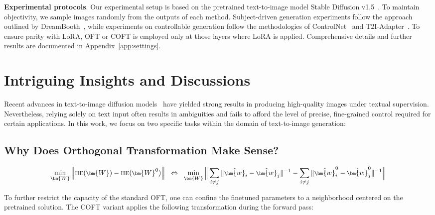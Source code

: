 \begin{itemize}[leftmargin=*,nosep]
\textbf{Experimental protocols}. Our experimental setup is based on the pretrained text-to-image model Stable Diffusion v1.5~\cite{rombach2022high}. To maintain objectivity, we sample images randomly from the outputs of each method. Subject-driven generation experiments follow the approach outlined by DreamBooth~\cite{ruiz2023dreambooth}, while experiments on controllable generation follow the methodologies of ControlNet~\cite{zhang2023adding} and T2I-Adapter~\cite{mou2023t2i}. To ensure parity with LoRA, OFT or COFT is employed only at those layers where LoRA is applied. Comprehensive details and further results are documented in Appendix~\ref{app:settings}.

\section{Intriguing Insights and Discussions}

Recent advances in text-to-image diffusion models~\cite{saharia2022photorealistic,ramesh2022hierarchical,rombach2022high} have yielded strong results in producing high-quality images under textual supervision. Nevertheless, relying solely on text input often results in ambiguities and fails to afford the level of precise, fine-grained control required for certain applications. In this work, we focus on two specific tasks within the domain of text-to-image generation:

\subsection{Why Does Orthogonal Transformation Make Sense?}

\begin{equation}\label{eq:oft_principle}
\footnotesize
\min_{\bm{W}} \left\| \text{HE}(\bm{W})-\text{HE}(\bm{W}^0)\right\|~~\Leftrightarrow~~\min_{\bm{W}} \bigg{\|} \sum_{i\neq j} \|\hat{\bm{w}}_i-\hat{\bm{w}}_j\|^{-1}-\sum_{i\neq j} \|\hat{\bm{w}}^0_i-\hat{\bm{w}}^0_j\|^{-1}\bigg{\|}
\end{equation}

To further restrict the capacity of the standard OFT, one can confine the finetuned parameters to a neighborhood centered on the pretrained solution. The COFT variant applies the following transformation during the forward pass:


\end{itemize}
